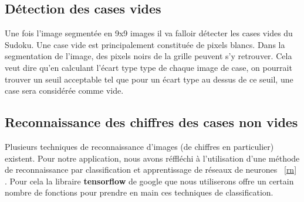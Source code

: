 \documentclass[11pt]{article}
\begin{document}
	\subsection{Détection des cases vides}
Une fois l'image segmentée en 9x9 images il va falloir détecter les cases vides du Sudoku. Une case vide est principalement constituée de pixels blancs. Dans la segmentation de l'image, des pixels noirs de la grille peuvent s'y retrouver. Cela veut dire qu'en calculant l'écart type type de chaque image de case, on pourrait trouver un seuil acceptable tel que pour un écart type au dessus de ce seuil, une case sera considérée comme vide.
	
	\subsection{Reconnaissance des chiffres des cases non vides}
Plusieurs techniques de reconnaissance d'images (de chiffres en particulier) existent. Pour notre application, nous avons réffléchi à l'utilisation d'une méthode de reconnaissance par classification et apprentissage de réseaux de neurones ~\ref{rn} . Pour cela la libraire \textbf{tensorflow} de google que nous utiliserons offre un certain nombre de fonctions pour prendre en main ces techniques de classification.
\end{document}
